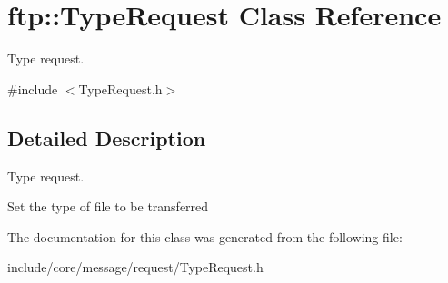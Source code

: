 \hypertarget{classftp_1_1_type_request}{\section{ftp\-:\-:Type\-Request Class Reference}
\label{classftp_1_1_type_request}
}


Type request.  




{\ttfamily \#include $<$Type\-Request.\-h$>$}



\subsection{Detailed Description}
Type request. 

Set the type of file to be transferred 

The documentation for this class was generated from the following file\-:\begin{DoxyCompactItemize}
\item 
include/core/message/request/Type\-Request.\-h\end{DoxyCompactItemize}
